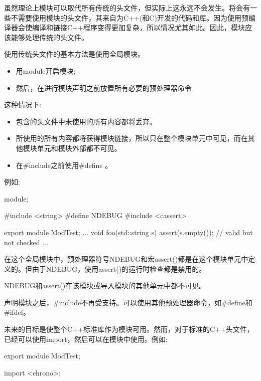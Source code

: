 
虽然理论上模块可以取代所有传统的头文件，但实际上这永远不会发生。将会有一些不需要使用模块的头文件，其来自为C++(和C)开发的代码和库。因为使用预编译器会使编译和链接C++程序变得更加复杂，所以情况尤其如此。因此，模块应该能够处理传统的头文件。

使用传统头文件的基本方法是使用全局模块。

\begin{itemize}
\item 
用module开启模块;

\item 
然后，在进行模块声明之前放置所有必要的预处理器命令
\end{itemize}

这种情况下:

\begin{itemize}
\item 
包含的头文件中未使用的所有内容都将丢弃。

\item 
所使用的所有内容都将获得模块链接，所以只在整个模块单元中可见，而在其他模块单元和模块外部都不可见。

\item 
在\#include之前使用\#define 。
\end{itemize}

例如:

\begin{cpp}
module;

#include <string>
#define NDEBUG
#include <cassert>

export module ModTest;
...
void foo(std::string s) {
	assert(s.empty()); // valid but not checked
	...
}
\end{cpp}

在这个全局模块中，预处理器符号NDEBUG和宏assert()都是在这个模块单元中定义的。但由于NDEBUG，使用assert()的运行时检查都是禁用的。

NDEBUG和assert()在该模块或导入模块的其他单元中都不可见。

声明模块之后，\#include不再受支持。可以使用其他预处理器命令，如\#define和\#ifdef。


未来的目标是使整个C++标准库作为模块可用。然而，对于标准的C++头文件，已经可以使用import，然后可以在模块中使用。例如:

\begin{cpp}
export module ModTest;

import <chrono>;
\end{cpp}

